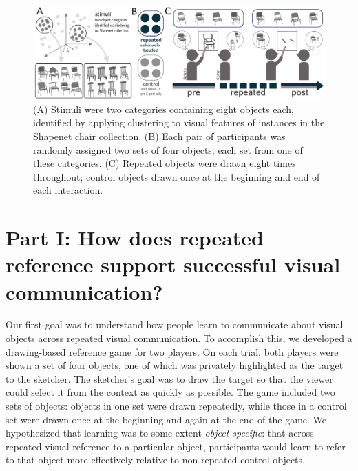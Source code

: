 \documentclass[10pt,letterpaper]{article}
\begin{document}
\begin{figure}
\includegraphics[width=\linewidth]{figures/task_stimuli.pdf}
\caption{(A) Stimuli were two categories containing eight objects each, identified by applying clustering to visual features of instances in the Shapenet chair collection. (B) Each pair of participants was randomly assigned two sets of four objects, each set from one of these categories. (C) Repeated objects were drawn eight times throughout; control objects drawn once at the beginning and end of each interaction.}
\label{task_stimuli}
\end{figure}

\section{Part I: How does repeated reference support successful visual communication?}

Our first goal was to understand how people learn to communicate about visual objects across repeated visual communication.
To accomplish this, we developed a drawing-based reference game for two players.
On each trial, both players were shown a set of four objects, one of which was privately highlighted as the target to the sketcher.
The sketcher's goal was to draw the target so that the viewer could select it from the context as quickly as possible.
The game included two sets of objects: objects in one set were drawn repeatedly, while those in a control set were drawn once at the beginning and again at the end of the game.
We hypothesized that learning was to some extent \emph{object-specific}: that across repeated visual reference to a particular object, participants would learn to refer to that object more effectively relative to non-repeated control objects.

\end{document}
